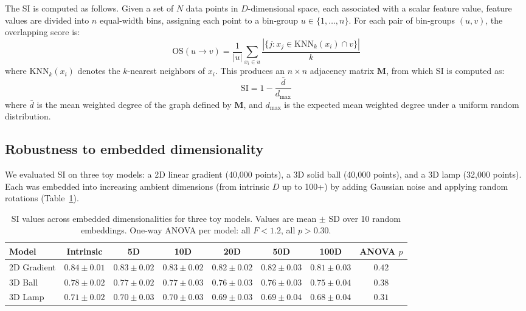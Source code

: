 \documentclass[11pt]{article}
\begin{document}
The SI is computed as follows. Given a set of $N$ data points in $D$-dimensional space, each associated with a scalar feature value, feature values are divided into $n$ equal-width bins, assigning each point to a bin-group $u \in \{1, \ldots, n\}$. For each pair of bin-groups $(u, v)$, the overlapping score is:
\begin{equation}
\text{OS}(u \to v) = \frac{1}{|u|} \sum_{x_i \in u} \frac{|\{j : x_j \in \text{KNN}_k(x_i) \cap v\}|}{k}
\end{equation}
where $\text{KNN}_k(x_i)$ denotes the $k$-nearest neighbors of $x_i$. This produces an $n \times n$ adjacency matrix $\mathbf{M}$, from which SI is computed as:
\begin{equation}
\text{SI} = 1 - \frac{\bar{d}}{d_{\max}}
\end{equation}
where $\bar{d}$ is the mean weighted degree of the graph defined by $\mathbf{M}$, and $d_{\max}$ is the expected mean weighted degree under a uniform random distribution.

\subsection{Robustness to embedded dimensionality}

We evaluated SI on three toy models: a 2D linear gradient (40{,}000 points), a 3D solid ball (40{,}000 points), and a 3D lamp (32{,}000 points). Each was embedded into increasing ambient dimensions (from intrinsic $D$ up to 100+) by adding Gaussian noise and applying random rotations (Table~\ref{tab:dimensionality}).

\begin{table}[H]
\centering
\caption{SI values across embedded dimensionalities for three toy models. Values are mean $\pm$ SD over 10 random embeddings. One-way ANOVA per model: all $F < 1.2$, all $p > 0.30$.}
\label{tab:dimensionality}
\begin{tabular}{lccccccc}
\toprule
\textbf{Model} & \textbf{Intrinsic} & \textbf{5D} & \textbf{10D} & \textbf{20D} & \textbf{50D} & \textbf{100D} & \textbf{ANOVA $p$} \\
\midrule
2D Gradient & $0.84 \pm 0.01$ & $0.83 \pm 0.02$ & $0.83 \pm 0.02$ & $0.82 \pm 0.02$ & $0.82 \pm 0.03$ & $0.81 \pm 0.03$ & $0.42$ \\
3D Ball & $0.78 \pm 0.02$ & $0.77 \pm 0.02$ & $0.77 \pm 0.03$ & $0.76 \pm 0.03$ & $0.76 \pm 0.03$ & $0.75 \pm 0.04$ & $0.38$ \\
3D Lamp & $0.71 \pm 0.02$ & $0.70 \pm 0.03$ & $0.70 \pm 0.03$ & $0.69 \pm 0.03$ & $0.69 \pm 0.04$ & $0.68 \pm 0.04$ & $0.31$ \\
\bottomrule
\end{tabular}
\end{table}
\end{document}
